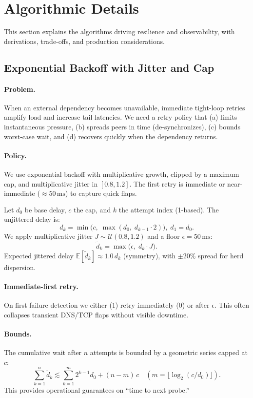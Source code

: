 \documentclass[11pt]{article}
\begin{document}
\section{Algorithmic Details}

This section explains the algorithms driving resilience and observability, with derivations, trade-offs, and production considerations.

\subsection{Exponential Backoff with Jitter and Cap}

\paragraph{Problem.} When an external dependency becomes unavailable, immediate tight-loop retries amplify load and increase tail latencies. We need a retry policy that (a) limits instantaneous pressure, (b) spreads peers in time (de-synchronizes), (c) bounds worst-case wait, and (d) recovers quickly when the dependency returns.

\paragraph{Policy.} We use exponential backoff with multiplicative growth, clipped by a maximum cap, and multiplicative jitter in \([0.8,1.2]\). The first retry is immediate or near-immediate (\(\approx 50\,\mathrm{ms}\)) to capture quick flaps.

Let \(d_0\) be base delay, \(c\) the cap, and \(k\) the attempt index (1-based). The unjittered delay is:
\[ d_k = \min\big(c,\; \max(d_0,\; d_{k-1}\cdot 2)\big),\; d_1 = d_0. \]
We apply multiplicative jitter \(J \sim \mathcal{U}(0.8, 1.2)\) and a floor \(\epsilon=50\,\mathrm{ms}\):
\[ \tilde d_k = \max\big(\epsilon,\; d_k \cdot J\big). \]
Expected jittered delay \(\mathbb{E}[\tilde d_k] \approx 1.0\, d_k\) (symmetry), with \(\pm 20\%\) spread for herd dispersion.

\paragraph{Immediate-first retry.} On first failure detection we either (1) retry immediately (\(0\)) or after \(\epsilon\). This often collapses transient DNS/TCP flaps without visible downtime.

\paragraph{Bounds.} The cumulative wait after \(n\) attempts is bounded by a geometric series capped at \(c\):
\[ \sum_{k=1}^{n} \tilde d_k \lesssim \sum_{k=1}^{m} 2^{k-1} d_0 + (n-m)\,c \quad (m=\lfloor \log_2(c/d_0) \rfloor). \]
This provides operational guarantees on “time to next probe.”
\end{document}
